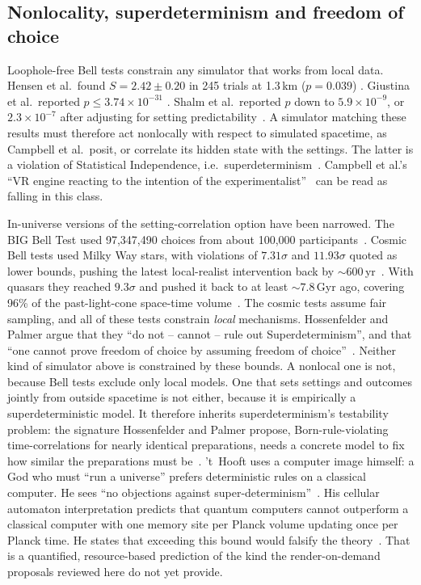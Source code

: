 \subsection{Nonlocality, superdeterminism and freedom of choice}
\label{sec:rendering-qm-bell}

Loophole-free Bell tests constrain any simulator that works from local data.
Hensen et al.\ found $S=2.42\pm0.20$ in 245 trials at 1.3\,km ($p=0.039$)
\cite{Hensen2015loophole}. Giustina et al.\ reported $p\le3.74\times10^{-31}$
\cite{Giustina2015significant}. Shalm et al.\ reported $p$ down to
$5.9\times10^{-9}$, or $2.3\times10^{-7}$ after adjusting for setting
predictability~\cite{Shalm2015strong}. A simulator matching these results must
therefore act nonlocally with respect to simulated spacetime, as Campbell et
al.\ posit, or correlate its hidden state with the settings. The latter is a
violation of Statistical Independence, i.e.\
superdeterminism~\cite{Hossenfelder2020rethinking}. Campbell et al.'s ``VR
engine reacting to the intention of the experimentalist''~\cite[p.~94]{Campbell2017on}
can be read as falling in this class.

In-universe versions of the setting-correlation option have been narrowed.
The BIG Bell Test used 97{,}347{,}490 choices from about 100{,}000
participants~\cite{BIGBellTest2018challenging}. Cosmic Bell tests used Milky
Way stars, with violations of $7.31\sigma$ and $11.93\sigma$ quoted as lower
bounds, pushing the latest local-realist intervention back by
$\sim600$\,yr~\cite{Handsteiner2017cosmic}. With quasars they reached $9.3\sigma$
and pushed it back to at least $\sim7.8$\,Gyr ago, covering 96\% of the
past-light-cone space-time volume~\cite{Rauch2018cosmic}. The cosmic tests assume
fair sampling, and all of these tests constrain \emph{local} mechanisms. Hossenfelder and Palmer
argue that they ``do not -- cannot -- rule out Superdeterminism'', and that
``one cannot prove freedom of choice by assuming freedom of
choice''~\cite[Sec.~4.3]{Hossenfelder2020rethinking}. Neither kind of simulator
above is constrained by these bounds. A nonlocal one is not, because Bell
tests exclude only local models. One that sets settings and outcomes jointly
from outside spacetime is not either, because it is empirically a
superdeterministic model. It therefore inherits superdeterminism's testability
problem: the signature Hossenfelder and Palmer propose, Born-rule-violating
time-correlations for nearly identical preparations, needs a concrete model to
fix how similar the preparations must be~\cite[Sec.~6]{Hossenfelder2020rethinking}.
't~Hooft uses a computer image himself: a God who must ``run a universe''
prefers deterministic rules on a classical computer. He sees ``no objections
against super-determinism''~\cite{tHooft2019free}. His cellular automaton
interpretation predicts that quantum computers cannot outperform a classical
computer with one memory site per Planck volume updating once per Planck time.
He states that exceeding this bound would falsify the
theory~\cite[Sec.~5.8]{tHooft2016cellular}. That is a quantified,
resource-based prediction of the kind the render-on-demand proposals reviewed
here do not yet provide.
